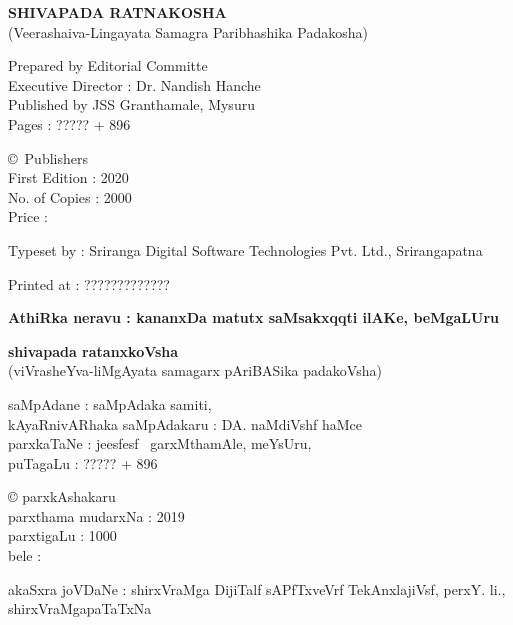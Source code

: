 \thispagestyle{empty}
\noindent
{\rm\sf\bfseries SHIVAPADA RATNAKOSHA}\\[5pt]
{\rm (Veerashaiva-Lingayata Samagra Paribhashika Padakosha)} 

\noindent
{\rm Prepared by Editorial Committe}\\
{\rm Executive Director : Dr. Nandish Hanche}\\
{\rm Published by JSS Granthamale, Mysuru}\\[8pt]
{\rm Pages : ????? + 896}

\vspace{1cm}

\noindent
{\rm \copyright \ Publishers}\\[7pt]
{\rm First Edition : 2020}\\[7pt]
{\rm No. of Copies : 2000}\\[7pt]
{\rm Price :} \rupee

\bigskip

\noindent
{\rm Typeset by : Sriranga Digital Software Technologies Pvt. Ltd., Srirangapatna}

\medskip

\noindent
{\rm Printed at : ?????????????}

\vfill

\noindent
{\bf AthiRka neravu : kananxDa matutx saMsakxqqti ilAKe, beMgaLUru}

\bigskip

\noindent
{\bf\large shivapada ratanxkoVsha}\\[5pt]
(viVrasheYva-liMgAyata samagarx pAriBASika padakoVsha) 

\smallskip

\noindent
saMpAdane : saMpAdaka samiti,\\
kAyaRnivARhaka saMpAdakaru : DA. naMdiVshf haMce\\
parxkaTaNe : je{esf}{esf} \ garxMthamAle, meYsUru,\\[8pt]
puTagaLu : {\rm ????? +} 896

\vspace{1cm}

\noindent
{\rm \copyright} parxkAshakaru\\[7pt]
parxthama mudarxNa : 2019\\[7pt]
parxtigaLu : 1000\\[10pt]
bele : \rupee

\bigskip

\noindent
akaSxra joVDaNe : shirxVraMga DijiTalf sAPfTxveVrf TekAnxlajiVsf, perxY. li., shirxVraMgapaTaTxNa

